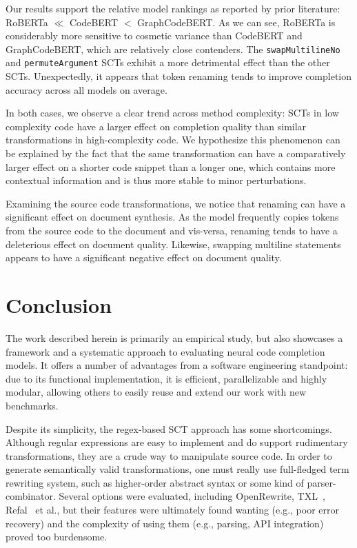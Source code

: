 \documentclass[usenames,dvipsnames]{article} %
\begin{document}
  Our results support the relative model rankings as reported by prior literature: RoBERTa $\ll$ CodeBERT $<$ GraphCodeBERT. As we can see, RoBERTa is considerably more sensitive to cosmetic variance than CodeBERT and GraphCodeBERT, which are relatively close contenders. The \lstinline|swapMultilineNo| and \lstinline|permuteArgument| SCTs exhibit a more detrimental effect than the other SCTs. Unexpectedly, it appears that token renaming tends to improve completion accuracy across all models on average.

  In both cases, we observe a clear trend across method complexity: SCTs in low complexity code have a larger effect on completion quality than similar transformations in high-complexity code. We hypothesize this phenomenon can be explained by the fact that the same transformation can have a comparatively larger effect on a shorter code snippet than a longer one, which contains more contextual information and is thus more stable to minor perturbations.

  Examining the source code transformations, we notice that renaming can have a significant effect on document synthesis. As the model frequently copies tokens from the source code to the document and vis-versa, renaming tends to have a deleterious effect on document quality. Likewise, swapping multiline statements appears to have a significant negative effect on document quality.

  \section{Conclusion}\label{sec:conclusion}

  The work described herein is primarily an empirical study, but also showcases a framework and a systematic approach to evaluating neural code completion models. It offers a number of advantages from a software engineering standpoint: due to its functional implementation, it is efficient, parallelizable and highly modular, allowing others to easily reuse and extend our work with new benchmarks.

  Despite its simplicity, the regex-based SCT approach has some shortcomings. Although regular expressions are easy to implement and do support rudimentary transformations, they are a crude way to manipulate source code. In order to generate semantically valid transformations, one must really use full-fledged term rewriting system, such as higher-order abstract syntax or some kind of parser-combinator. Several options were evaluated, including OpenRewrite, TXL~\citep{cordy2004txl}, Refal~\citep{gurin1991refal} et al., but their features were ultimately found wanting (e.g., poor error recovery) and the complexity of using them (e.g., parsing, API integration) proved too burdensome.
\end{document}
